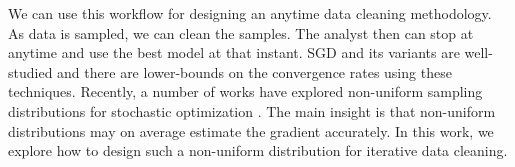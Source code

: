 We can use this workflow for designing an anytime data cleaning methodology.
As data is sampled, we can clean the samples.
The analyst then can stop at anytime and use the best model at that instant.
SGD and its variants are well-studied and there are lower-bounds on the convergence rates using these techniques. 
Recently, a number of works have explored non-uniform sampling distributions for stochastic optimization \cite{zhao2014stochastic, qu2014randomized}.
The main insight is that non-uniform distributions may on average estimate the gradient accurately.
In this work, we explore how to design such a non-uniform distribution for iterative data cleaning.

\fi


 